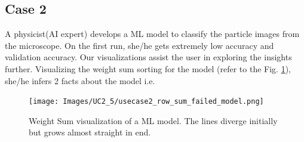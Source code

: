\documentclass[journal]{vgtc}                %
\begin{document}
\subsection{Case 2}
A physicist(AI expert) develops a ML model to classify the particle images from the microscope.
On the first run, she/he gets extremely low accuracy and validation accuracy. Our visualizations assist the user in exploring the insights further. Visualizing the weight sum sorting for the model (refer to the Fig. \ref{uc2_weight}), she/he infers 2 facts about the model i.e. 
 
 \begin{figure}
    \graphicspath{{\Images}}
    \texttt{[image: Images/UC2\_5/usecase2\_row\_sum\_failed\_model.png]}
    \caption{Weight Sum visualization of a ML model. The lines diverge initially but grows almost straight in end.}
    \label{uc2_weight}
\end{figure}
\end{document}
